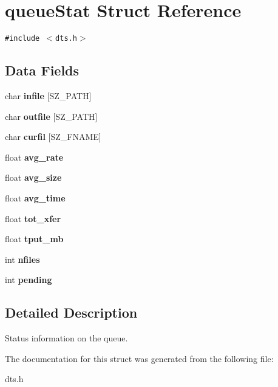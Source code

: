 \hypertarget{structqueueStat}{
\section{queueStat Struct Reference}
\label{structqueueStat}
}
{\tt \#include $<$dts.h$>$}

\subsection*{Data Fields}
\begin{CompactItemize}
\item 
\hypertarget{structqueueStat_ffef4f1952589578f23f08c0a7435d6e}{
char \textbf{infile} \mbox{[}SZ\_\-PATH\mbox{]}}
\label{structqueueStat_ffef4f1952589578f23f08c0a7435d6e}

\item 
\hypertarget{structqueueStat_df704c9fc0a885adc4970889a37838ff}{
char \textbf{outfile} \mbox{[}SZ\_\-PATH\mbox{]}}
\label{structqueueStat_df704c9fc0a885adc4970889a37838ff}

\item 
\hypertarget{structqueueStat_910fe4bab4a229a864e13ff5e372195a}{
char \textbf{curfil} \mbox{[}SZ\_\-FNAME\mbox{]}}
\label{structqueueStat_910fe4bab4a229a864e13ff5e372195a}

\item 
\hypertarget{structqueueStat_77fc13d85efedfbb9bf6ee614790ace5}{
float \textbf{avg\_\-rate}}
\label{structqueueStat_77fc13d85efedfbb9bf6ee614790ace5}

\item 
\hypertarget{structqueueStat_2502f843d8dc90b65436732711326648}{
float \textbf{avg\_\-size}}
\label{structqueueStat_2502f843d8dc90b65436732711326648}

\item 
\hypertarget{structqueueStat_3a6e355245a33de486aba2aabadffb22}{
float \textbf{avg\_\-time}}
\label{structqueueStat_3a6e355245a33de486aba2aabadffb22}

\item 
\hypertarget{structqueueStat_e3f37cad45cab83b60b79ed94b9aa7f2}{
float \textbf{tot\_\-xfer}}
\label{structqueueStat_e3f37cad45cab83b60b79ed94b9aa7f2}

\item 
\hypertarget{structqueueStat_b76a56a199941e681af3e912d3cf77f1}{
float \textbf{tput\_\-mb}}
\label{structqueueStat_b76a56a199941e681af3e912d3cf77f1}

\item 
\hypertarget{structqueueStat_ff5d5c18cb79098e25e4ad5bce41b411}{
int \textbf{nfiles}}
\label{structqueueStat_ff5d5c18cb79098e25e4ad5bce41b411}

\item 
\hypertarget{structqueueStat_ee89549a6778e861e1931741600d061a}{
int \textbf{pending}}
\label{structqueueStat_ee89549a6778e861e1931741600d061a}

\end{CompactItemize}


\subsection{Detailed Description}
Status information on the queue. 

The documentation for this struct was generated from the following file:\begin{CompactItemize}
\item 
dts.h\end{CompactItemize}
